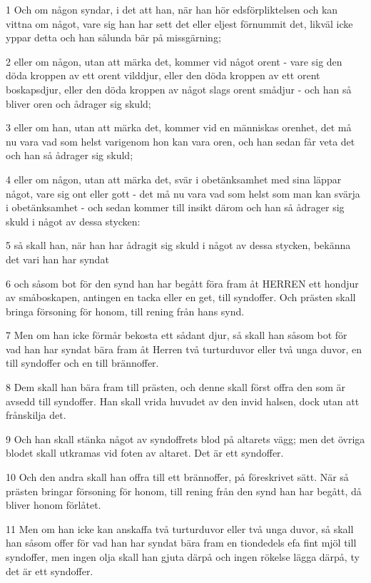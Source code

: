 \par 1 Och om någon syndar, i det att han, när han hör edsförpliktelsen och kan vittna om något, vare sig han har sett det eller eljest förnummit det, likväl icke yppar detta och han sålunda bär på missgärning;
\par 2 eller om någon, utan att märka det, kommer vid något orent - vare sig den döda kroppen av ett orent vilddjur, eller den döda kroppen av ett orent boskapsdjur, eller den döda kroppen av något slags orent smådjur - och han så bliver oren och ådrager sig skuld;
\par 3 eller om han, utan att märka det, kommer vid en människas orenhet, det må nu vara vad som helst varigenom hon kan vara oren, och han sedan får veta det och han så ådrager sig skuld;
\par 4 eller om någon, utan att märka det, svär i obetänksamhet med sina läppar något, vare sig ont eller gott - det må nu vara vad som helst som man kan svärja i obetänksamhet - och sedan kommer till insikt därom och han så ådrager sig skuld i något av dessa stycken:
\par 5 så skall han, när han har ådragit sig skuld i något av dessa stycken, bekänna det vari han har syndat
\par 6 och såsom bot för den synd han har begått föra fram åt HERREN ett hondjur av småboskapen, antingen en tacka eller en get, till syndoffer. Och prästen skall bringa försoning för honom, till rening från hans synd.
\par 7 Men om han icke förmår bekosta ett sådant djur, så skall han såsom bot för vad han har syndat bära fram åt Herren två turturduvor eller två unga duvor, en till syndoffer och en till brännoffer.
\par 8 Dem skall han bära fram till prästen, och denne skall först offra den som är avsedd till syndoffer. Han skall vrida huvudet av den invid halsen, dock utan att frånskilja det.
\par 9 Och han skall stänka något av syndoffrets blod på altarets vägg; men det övriga blodet skall utkramas vid foten av altaret. Det är ett syndoffer.
\par 10 Och den andra skall han offra till ett brännoffer, på föreskrivet sätt. När så prästen bringar försoning för honom, till rening från den synd han har begått, då bliver honom förlåtet.
\par 11 Men om han icke kan anskaffa två turturduvor eller två unga duvor, så skall han såsom offer för vad han har syndat bära fram en tiondedels efa fint mjöl till syndoffer, men ingen olja skall han gjuta därpå och ingen rökelse lägga därpå, ty det är ett syndoffer.
